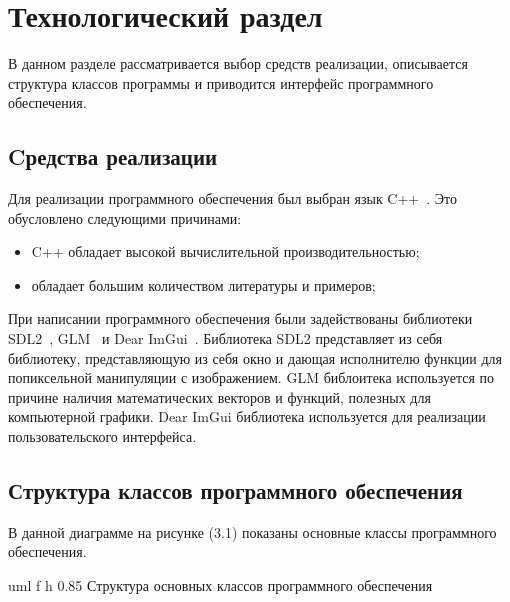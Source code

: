\chapter{Технологический раздел}

В данном разделе рассматривается выбор средств реализации, описывается структура
классов программы и приводится интерфейс программного обеспечения.

\section{Cредства реализации}

Для реализации программного обеспечения был выбран язык C++~\cite{cpp}.
Это обусловлено следующими причинами:
\begin{itemize}
    \item C++ обладает высокой вычислительной производительностью;
    \item обладает большим количеством литературы и примеров;
\end{itemize}


При написании программного обеспечения были задействованы библиотеки
SDL2~\cite{sdl}, GLM~\cite{glm} и Dear ImGui~\cite{imgui}. Библиотека SDL2 представляет из себя библиотеку,
представляющую из себя окно и дающая исполнителю функции для попиксельной
манипуляции с изображением. GLM библоитека используется по причине
наличия математических векторов и функций, полезных для компьютерной графики.
Dear ImGui библиотека используется для реализации пользовательского интерфейса.


\section{Структура классов программного обеспечения}

В данной диаграмме на рисунке (3.1) показаны основные
классы программного обеспечения.


{uml}
{f}
{h}
{0.85\textwidth}
{Структура основных классов программного обеспечения}


